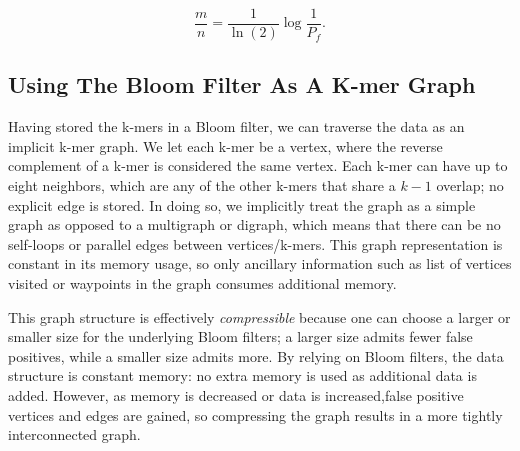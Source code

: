 \documentclass[12pt]{article} \usepackage{simplemargins}
\begin{document}
\begin{displaymath}
\frac{m}{n} = \frac{1}{\ln(2)} \log{\frac{1}{P_f}}.
\end{displaymath}

\begin{table}
\caption{The number of bits needed to store each k-mer for selected
false positive rates.  These numbers are independent of the specific k
chosen.}
\end{table}

\subsection{Using The Bloom Filter As A K-mer Graph}
Having stored the k-mers in a Bloom filter, we can traverse
the data as an implicit k-mer graph. We let each k-mer be a vertex, where
the reverse complement of a k-mer is considered the same
vertex. Each k-mer can
have up to eight neighbors, which are any of the other k-mers that
 share a $k-1$
overlap; no explicit edge is stored. In doing so, we implicitly 
treat the graph as a simple graph as opposed to a multigraph or 
digraph, which means that there can be no self-loops or parallel 
edges between vertices/k-mers. This graph representation is constant 
in its memory usage, so only ancillary information such as list 
of vertices visited or waypoints in the graph consumes additional 
memory.

This graph structure is effectively {\em compressible}
because one can choose a larger
or smaller size for the underlying Bloom filters; a larger size admits fewer
false positives, while a smaller size admits more. By relying on Bloom
filters, the data structure is constant memory: no extra memory is
used as additional data is added. However, as memory is decreased or data
is increased,false positive vertices and edges are gained, so
compressing the graph results in a more tightly interconnected graph.
\end{document}

